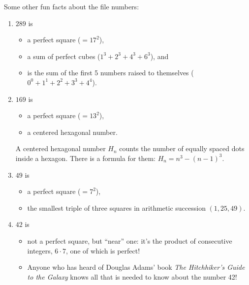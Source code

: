 \documentclass[14pt]{extarticle}
\begin{document}
Some other fun facts about the file numbers:

\begin{enumerate}
\item
$289$ is
\begin{itemize}
\item
  a perfect square ($=17^2$),
\item
  a sum of perfect cubes ($1^3+2^3+4^3+6^3$), and
\item
  is the sum of the first 5 numbers raised to themselves
($0^0+1^1+2^2+3^3+4^4$).
\end{itemize}

\item
$169$ is
\begin{itemize}
\item
  a perfect square ($=13^2$),
\item  
  a centered hexagonal number.
\end{itemize}


\begin{center}
\end{center}
%
A centered hexagonal number $H_n$ counts the number of
  equally spaced dots inside a hexagon. There is a formula for them:
  $H_n = n^3-(n-1)^3$.

\item
$49$ is
\begin{itemize}
\item
  a perfect square ($=7^2$),
\item
  the smallest triple of three squares in arithmetic succession
  $(1,25,49)$.
\end{itemize}
\item
$42$ is 
\begin{itemize}
\item
  not a perfect square, but ``near'' one: it's the product of consecutive
  integers, $6\cdot 7$, one of which is perfect!
\item
  Anyone who has heard of Douglas Adams' book
{\it The Hitchhiker's Guide to the Galaxy} knows all that is needed to know
about the number 42!
\end{itemize}


\end{enumerate}
\end{document}
